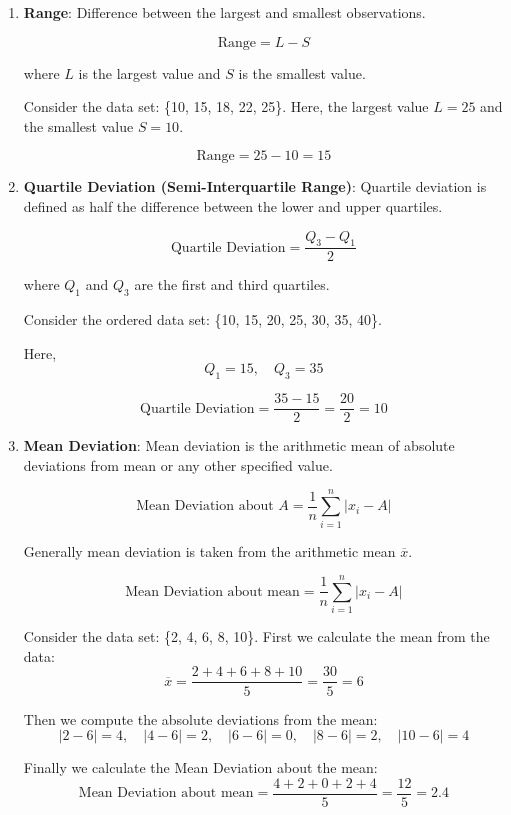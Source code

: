 \documentclass[twoside]{book}
\begin{document}
\begin{enumerate}
    \item \textbf{Range}: Difference between the largest and smallest observations.
    \begin{textbox}
        \[
    \text{Range} = L - S
    \]
    \end{textbox}
    where \( L \) is the largest value and \( S \) is the smallest value.

    Consider the data set: \{10, 15, 18, 22, 25\}.
Here, the largest value \( L = 25 \) and the smallest value \( S = 10 \).

\[
\text{Range} = 25 - 10 = 15
\]
    \item \textbf{Quartile Deviation (Semi-Interquartile Range)}: Quartile deviation is defined as half the difference between the lower and upper quartiles.
    \begin{textbox}
    \[
    \text{Quartile Deviation} = \frac{Q_3 - Q_1}{2}
    \]
    \end{textbox}
    where \( Q_1 \) and \( Q_3 \) are the first and third quartiles.

    Consider the ordered data set: \{10, 15, 20, 25, 30, 35, 40\}.

Here,
\[
Q_1 = 15, \quad Q_3 = 35
\]

\[
\text{Quartile Deviation} = \frac{35 - 15}{2} = \frac{20}{2} = 10
\]

    \item \textbf{Mean Deviation}: Mean deviation is the arithmetic mean of absolute deviations from mean or any other specified value.
    \begin{textbox}
    \[
    \text{Mean Deviation about }A = \frac{1}{n} \sum_{i=1}^{n} |x_i - A|
    \]
    \end{textbox}
    Generally mean deviation is taken from the arithmetic mean $\overline{x}$.
    \begin{textbox}
    \[
    \text{Mean Deviation about mean} = \frac{1}{n} \sum_{i=1}^{n} |x_i - A|
    \]
    \end{textbox}

    Consider the data set: \{2, 4, 6, 8, 10\}. First we calculate the mean from the data:
\[
\overline{x} = \frac{2 + 4 + 6 + 8 + 10}{5} = \frac{30}{5} = 6
\]

Then we compute the absolute deviations from the mean:
\[
|2 - 6| = 4,\quad |4 - 6| = 2,\quad |6 - 6| = 0,\quad |8 - 6| = 2,\quad |10 - 6| = 4
\]

Finally we calculate the Mean Deviation about the mean:
\[
\text{Mean Deviation about mean} = \frac{4 + 2 + 0 + 2 + 4}{5} = \frac{12}{5} = 2.4
\]


\end{enumerate}
\end{document}

